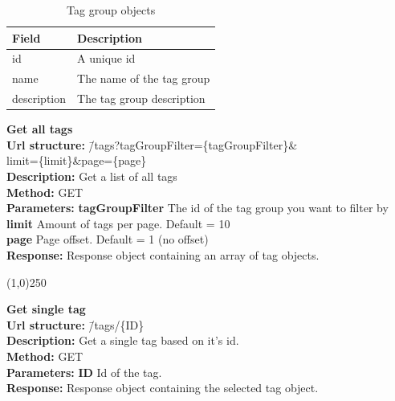\documentclass[11pt]{article}
\begin{document}
\begin{table}[H]
\caption{Tag group objects}
\begin{center}
\begin{tabular}{|l|l|}
\hline
 Field        &  Description                \\
\hline
 id           &  A unique id                \\
 name         &  The name of the tag group  \\
 description  &  The tag group description  \\
\hline
\end{tabular}
\end{center}
\end{table}

\begin{tabbing}
\textbf{Get all tags} \\
\textcolor{black!60}{\textbf{Url structure:}} \hspace{0.2in} \= /tags?tagGroupFilter=\{tagGroupFilter\}\& \\
\> limit=\{limit\}\&page=\{page\} \\
\textcolor{black!60}{\textbf{Description:}}  \> Get a list of all tags\\
\textcolor{black!60}{\textbf{Method:}} \> GET \\
\textcolor{black!60}{\textbf{Parameters:}} \> \textbf{tagGroupFilter} The id of the tag group you want to filter by \\
\> \textbf{limit} Amount of tags per page. Default = 10 \\
\> \textbf{page} Page offset. Default = 1 (no offset) \\
\textcolor{black!60}{\textbf{Response:}} \> Response object containing an array of tag objects.
\end{tabbing}

\begin{center}\line(1,0){250}\end{center}

\begin{tabbing}
\textbf{Get single tag} \\
\textcolor{black!60}{\textbf{Url structure:}} \hspace{0.2in} \= /tags/\{ID\} \\
\textcolor{black!60}{\textbf{Description:}}  \> Get a single tag based on it's id. \\
\textcolor{black!60}{\textbf{Method:}} \> GET \\
\textcolor{black!60}{\textbf{Parameters:}} \> \textbf{ID} Id of the tag. \\
\textcolor{black!60}{\textbf{Response:}} \> Response object containing the selected tag object.
\end{tabbing}
\end{document}
